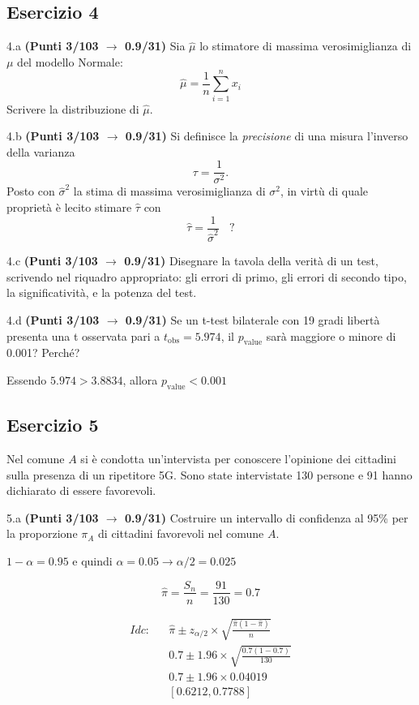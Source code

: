 \documentclass[
  11pt,
]{book}
\theoremstyle{mytheoremstyle}
\theoremstyle{mydefstyle}
\newenvironment{sol}
  {
  \begin{tcolorbox}[enhanced,breakable,arc=0.1mm,boxrule=1pt,colback=white,colframe=iblue,
  title=\bf \fontfamily{lmss}\selectfont \hspace{.5 cm} Soluzione,drop fuzzy shadow]

}{
\end{tcolorbox}
  }
\begin{document}
\subsection{Esercizio 4}\label{esercizio-4-47}

4.a \textbf{(Punti 3/103 \(\rightarrow\) 0.9/31)} Sia \(\hat \mu\) lo stimatore di massima verosimiglianza di \(\mu\) del modello Normale:
\[\hat\mu =  \frac 1n\sum_{i=1}^n x_i\]
Scrivere la distribuzione di \(\hat \mu\).

4.b \textbf{(Punti 3/103 \(\rightarrow\) 0.9/31)} Si definisce la \emph{precisione} di una misura l'inverso della varianza
\[
\tau = \frac 1{\sigma^2}.
\]
Posto con \(\hat\sigma^2\) la stima di massima verosimiglianza di \(\sigma^2\), in virtù di quale proprietà
è lecito stimare \(\hat\tau\) con
\[
\hat\tau = \frac 1{\hat\sigma^2}~~~~?
\]

4.c \textbf{(Punti 3/103 \(\rightarrow\) 0.9/31)} Disegnare la tavola della verità di un test, scrivendo nel riquadro appropriato: gli errori di primo, gli errori di secondo tipo, la significatività, e la potenza del test.

4.d \textbf{(Punti 3/103 \(\rightarrow\) 0.9/31)} Se un t-test bilaterale con 19 gradi libertà presenta una
t osservata pari a \(t_\text{obs}=5.974\), il \(p_\text{value}\) sarà maggiore o minore di 0.001? Perché?

\begin{sol}
Essendo \(5.974> 3.8834\), allora
\(p_\text{value}<0.001\)

\end{sol}

\subsection{Esercizio 5}\label{esercizio-5-46}

Nel comune \(A\) si è condotta un'intervista per conoscere l'opinione dei cittadini sulla presenza di un ripetitore 5G.
Sono state intervistate 130 persone e 91 hanno dichiarato di essere favorevoli.

5.a \textbf{(Punti 3/103 \(\rightarrow\) 0.9/31)} Costruire un intervallo di confidenza al 95\% per la proporzione \(\pi_A\) di cittadini favorevoli nel comune \(A\).

\begin{sol}
\(1-\alpha =0.95\) e quindi \(\alpha=0.05\rightarrow \alpha/2=0.025\)

\[
  \hat\pi = \frac{S_n}n = \frac{ 91 }{ 130 }= 0.7 
\]

\begin{eqnarray*}
  Idc: & &  \hat\pi \pm  z_{\alpha/2} \times \sqrt{\frac{\hat\pi(1-\hat\pi)}{n}} \\
     & &  0.7 \pm  1.96 \times \sqrt{\frac{ 0.7 (1- 0.7 )}{ 130 }} \\
     & &  0.7 \pm  1.96 \times  0.04019 \\
     & & [ 0.6212 ,  0.7788 ]
\end{eqnarray*}

\end{sol}
\end{document}
